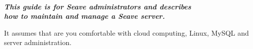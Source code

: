 \documentclass[11pt, a4paper]{article}
\begin{document}
\renewcommand{\thepage}{\roman{page}} %





\newpage
\thispagestyle{empty}

~
\vfill

\begin{center}
	\Large\bfseries\itshape
	This guide is for Seave administrators and describes\\ how to maintain and manage a Seave server.
	
	\vspace{2\baselineskip} 

	It assumes that are you comfortable with cloud computing, Linux, MySQL and server administration.
\end{center}

\vfill\vfill
~

\newpage


\tableofcontents %


\clearpage
\renewcommand{\thepage}{\arabic{page}} %
\setcounter{page}{1} %




\end{document}
